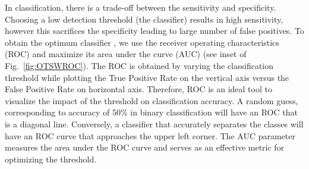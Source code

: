 \documentclass[aps,pra,reprint,superscriptaddress]{revtex4-1}
\begin{document}
In classification, there is a trade-off between the sensitivity and specificity. Choosing a low detection threshold (the classifier) results in high sensitivity, however this sacrifices the specificity leading to large number of false positives. To obtain the optimum classifier \cite{powers2011evaluation, liu2008roc}, we use the receiver operating characteristics (ROC) \cite{bradley1997use} and maximize its area under the curve (AUC) \cite{hanley1982meaning, ling2003auc, cortes2004auc, huang2005using} (see inset of Fig.~\ref{fig:OTSWROC}). The ROC is obtained by varying the classification threshold while plotting the True Positive Rate on the vertical axis versus the False Positive Rate on horizontal axis. Therefore, ROC is an ideal tool to visualize the impact of the threshold on classification accuracy. A random guess, corresponding to accuracy of 50\% in binary classification will have an ROC that is a diagonal line. Conversely, a classifier that accurately separates the classes will have an ROC curve that approaches the upper left corner. The AUC parameter measures the area under the ROC curve and serves as an effective metric for optimizing the threshold.
\end{document}
